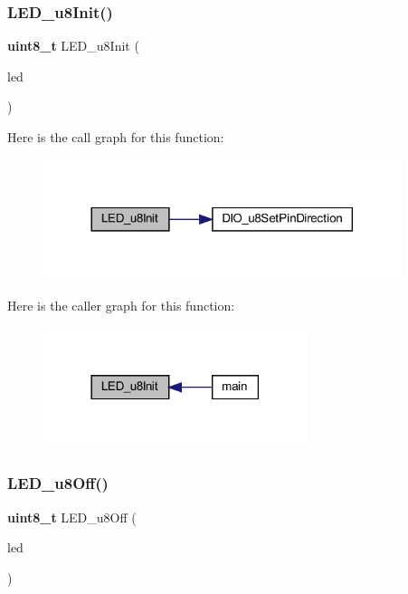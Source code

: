 \subsubsection{L\+E\+D\+\_\+u8\+Init()}
{\footnotesize\ttfamily \textbf{ uint8\+\_\+t} L\+E\+D\+\_\+u8\+Init (\begin{DoxyParamCaption}\item[{\textbf{ L\+E\+D\+\_\+t}}]{led }\end{DoxyParamCaption})}

Here is the call graph for this function\+:\nopagebreak
\begin{figure}[H]
\begin{center}
\leavevmode
\includegraphics[width=296pt]{_l_e_d_8c_a5ffbd3f57e696c662ae3ae52b119e867_cgraph}
\end{center}
\end{figure}
Here is the caller graph for this function\+:\nopagebreak
\begin{figure}[H]
\begin{center}
\leavevmode
\includegraphics[width=218pt]{_l_e_d_8c_a5ffbd3f57e696c662ae3ae52b119e867_icgraph}
\end{center}
\end{figure}
\mbox{\label{_l_e_d_8c_a9d5b876815db0f9fa1d1e2b3ecb4de64}} 
\subsubsection{L\+E\+D\+\_\+u8\+Off()}
{\footnotesize\ttfamily \textbf{ uint8\+\_\+t} L\+E\+D\+\_\+u8\+Off (\begin{DoxyParamCaption}\item[{\textbf{ L\+E\+D\+\_\+t}}]{led }\end{DoxyParamCaption})}

